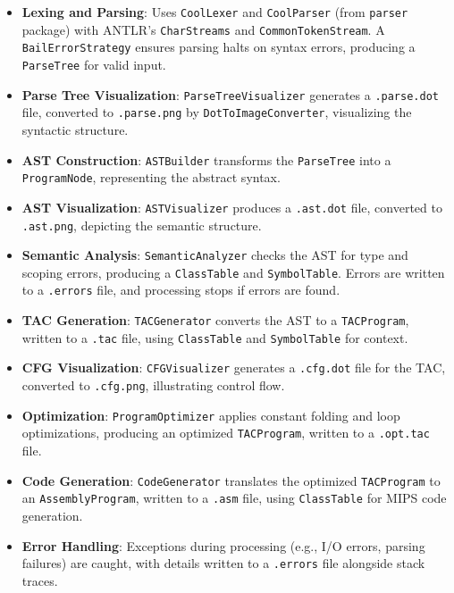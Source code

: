 \documentclass[11pt, titlepage]{article}
\begin{document}
\begin{itemize}[leftmargin=*]
    \item \textbf{Lexing and Parsing}: Uses \texttt{CoolLexer} and \texttt{CoolParser} (from \texttt{parser} package) with ANTLR's \texttt{CharStreams} and \texttt{CommonTokenStream}. A \texttt{BailErrorStrategy} ensures parsing halts on syntax errors, producing a \texttt{ParseTree} for valid input.
    \item \textbf{Parse Tree Visualization}: \texttt{ParseTreeVisualizer} generates a \texttt{.parse.dot} file, converted to \texttt{.parse.png} by \texttt{DotToImageConverter}, visualizing the syntactic structure.
    \item \textbf{AST Construction}: \texttt{ASTBuilder} transforms the \texttt{ParseTree} into a \texttt{ProgramNode}, representing the abstract syntax.
    \item \textbf{AST Visualization}: \texttt{ASTVisualizer} produces a \texttt{.ast.dot} file, converted to \texttt{.ast.png}, depicting the semantic structure.
    \item \textbf{Semantic Analysis}: \texttt{SemanticAnalyzer} checks the AST for type and scoping errors, producing a \texttt{ClassTable} and \texttt{SymbolTable}. Errors are written to a \texttt{.errors} file, and processing stops if errors are found.
    \item \textbf{TAC Generation}: \texttt{TACGenerator} converts the AST to a \texttt{TACProgram}, written to a \texttt{.tac} file, using \texttt{ClassTable} and \texttt{SymbolTable} for context.
    \item \textbf{CFG Visualization}: \texttt{CFGVisualizer} generates a \texttt{.cfg.dot} file for the TAC, converted to \texttt{.cfg.png}, illustrating control flow.
    \item \textbf{Optimization}: \texttt{ProgramOptimizer} applies constant folding and loop optimizations, producing an optimized \texttt{TACProgram}, written to a \texttt{.opt.tac} file.
    \item \textbf{Code Generation}: \texttt{CodeGenerator} translates the optimized \texttt{TACProgram} to an \texttt{AssemblyProgram}, written to a \texttt{.asm} file, using \texttt{ClassTable} for MIPS code generation.
    \item \textbf{Error Handling}: Exceptions during processing (e.g., I/O errors, parsing failures) are caught, with details written to a \texttt{.errors} file alongside stack traces.
\end{itemize}
\end{document}
